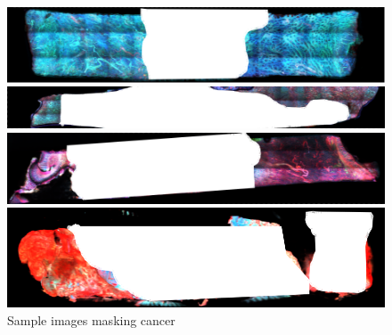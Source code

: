 \begin{figure}[H]
	\centering
	
	\begin{minipage}{0.8\columnwidth}
		\centering
		\includegraphics[clip, width=\linewidth]{fig/raw_data/label/C-013}
	\end{minipage}	
	
	\begin{minipage}{0.8\columnwidth}
		\centering
		\includegraphics[clip, width=\linewidth]{fig/raw_data/label/C-012}
	\end{minipage}
	
	\begin{minipage}{0.8\columnwidth}
		\centering
		\includegraphics[clip, width=\linewidth]{fig/raw_data/label/C-009}
	\end{minipage}
	
	\begin{minipage}{0.8\columnwidth}
		\centering
		\includegraphics[clip, width=\linewidth]{fig/raw_data/label/C-011}
	\end{minipage}
	
	\caption{Sample images masking cancer}
	\label{fig:切り取り画像}
	
\end{figure}


